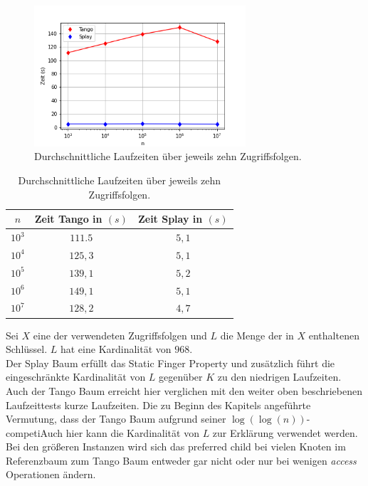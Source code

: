 \documentclass[a4paper,12pt]{article}
\begin{document}
\begin{figure}[H]
	\centering
	\includegraphics[width=0.7\textwidth]{"Medien/laufzeittest/diagramm/staticfinger3"}
	\caption{Durchschnittliche Laufzeiten über jeweils zehn Zugriffsfolgen.}
\end{figure}
\begin{table}[H]
	\begin{center}
		\begin{tabular}[c]{|c|c|c|}
			\hline
		$n$ & Zeit Tango in $\left(s\right)$ &Zeit Splay in $\left(s\right)$ \\
		\hline
		$10^3$ & $111.5$ &$5,1$ \\
		\hline
		$10^4$  & $125,3$ &$5,1$  \\
		\hline
		$10^5$  & $139,1$ &  $5,2$  \\
		\hline
		$10^6$  & $149,1$ &$5,1$  \\
		\hline
		$10^7$  & $128,2$ &$4,7$  \\
		\hline
		\end{tabular}
		\caption{Durchschnittliche Laufzeiten über jeweils zehn Zugriffsfolgen.} 
	\end{center}
\end{table}
\noindent Sei $X$ eine der verwendeten Zugriffsfolgen und $L$ die Menge der in $X$ enthaltenen Schlüssel. $L$ hat eine Kardinalität von $968$. \\
Der Splay Baum erfüllt das Static Finger Property und zusätzlich führt die eingeschränkte Kardinalität von  $L$ gegenüber $K$ zu den niedrigen Laufzeiten.     
Auch der Tango Baum erreicht hier verglichen mit den weiter oben beschriebenen Laufzeittests kurze Laufzeiten. Die zu Beginn des Kapitels angeführte Vermutung, dass der Tango Baum aufgrund seiner $\log\left(\log\left(n\right)\right)$-competiAuch hier kann die Kardinalität von $L$ zur Erklärung verwendet werden. Bei den größeren Instanzen wird sich das preferred child bei vielen Knoten im Referenzbaum zum Tango Baum entweder gar nicht oder nur bei wenigen \textit{access} Operationen ändern. \\
\end{document}
